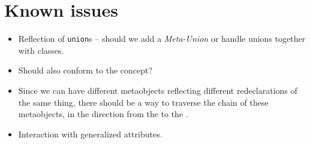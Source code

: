 \section{Known issues}

\begin{itemize}

\item{Reflection of \texttt{union}s -- should we add a {\em Meta-Union} or
handle unions together with classes.}

\item{Should  also conform to the  concept?}

\item{Since we can have different metaobjects reflecting different redeclarations
of the same thing, there should be a way to traverse the chain of these metaobjects,
in the direction from the  to the .}

\item{Interaction with generalized attributes.}

\end{itemize}
